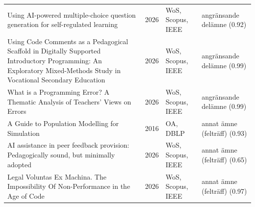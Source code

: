 \begin{longtable}{@{}%
  >{\raggedright\arraybackslash}p{}c%
  >{\raggedright\arraybackslash}p{}%
  >{\raggedright\arraybackslash}p{}@{}}
Using AI-powered multiple-choice question generation for self-regulated learning & 2026 & WoS, Scopus, IEEE & angränsande delämne (0.92) \\
Using Code Comments as a Pedagogical Scaffold in Digitally Supported Introductory Programming: An Exploratory Mixed-Methods Study in Vocational Secondary Education & 2026 & WoS, Scopus, IEEE & angränsande delämne (0.99) \\
What is a Programming Error? A Thematic Analysis of Teachers' Views on Errors & 2026 & WoS, Scopus, IEEE & angränsande delämne (0.99) \\
A Guide to Population Modelling for Simulation & 2016 & OA, DBLP & annat ämne (felträff) (0.93) \\
AI assistance in peer feedback provision: Pedagogically sound, but minimally adopted & 2026 & WoS, Scopus, IEEE & annat ämne (felträff) (0.65) \\
Legal Voluntas Ex Machina. The Impossibility Of Non-Performance in the Age of Code & 2026 & WoS, Scopus, IEEE & annat ämne (felträff) (0.97) \\
\end{longtable}
\endgroup
